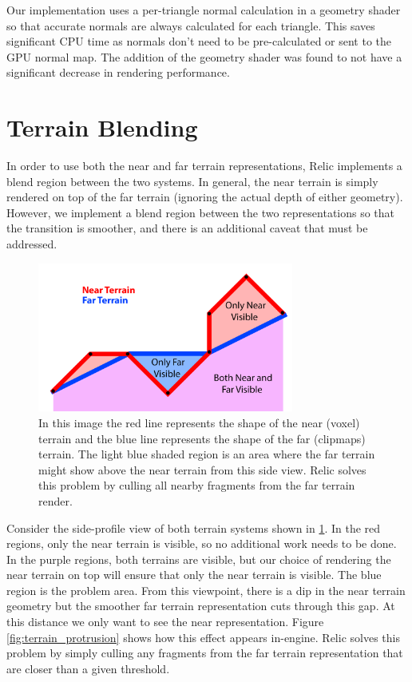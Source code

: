 Our implementation uses a per-triangle normal calculation in a geometry shader so that accurate normals are always calculated for each triangle.
This saves significant CPU time as normals don't need to be pre-calculated or sent to the GPU normal map.
The addition of the geometry shader was found to not have a significant decrease in rendering performance.

\section{Terrain Blending} \label{blending} %

In order to use both the near and far terrain representations, Relic implements a blend region between the two systems.
In general, the near terrain is simply rendered on top of the far terrain (ignoring the actual depth of either geometry).
However, we implement a blend region between the two representations so that the transition is smoother, and there is an additional caveat that must be addressed.

\begin{figure}
	\centering
		\includegraphics[width=0.75\textwidth]{figures/terrain_overlap.png}
	\caption{
		In this image the red line represents the shape of the near (voxel) terrain and the blue line represents the shape of the far (clipmaps) terrain.
		The light blue shaded region is an area where the far terrain might show above the near terrain from this side view.
		Relic solves this problem by culling all nearby fragments from the far terrain render.
	}
	\label{fig:terrain_overlap}
\end{figure}

Consider the side-profile view of both terrain systems shown in \ref{fig:terrain_overlap}.
In the red regions, only the near terrain is visible, so no additional work needs to be done.
In the purple regions, both terrains are visible, but our choice of rendering the near terrain on top will ensure that only the near terrain is visible.
The blue region is the problem area.
From this viewpoint, there is a dip in the near terrain geometry but the smoother far terrain representation cuts through this gap.
At this distance we only want to see the near representation.
Figure \ref{fig:terrain_protrusion} shows how this effect appears in-engine.
Relic solves this problem by simply culling any fragments from the far terrain representation that are closer than a given threshold.

